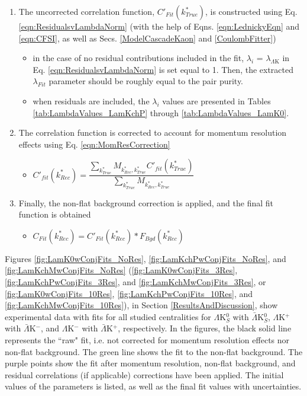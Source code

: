 \documentclass[../AnalysisNoteJBuxton.tex]{subfiles}
\begin{document}
\begin{enumerate}
 \item The uncorrected correlation function, $C'_{Fit}(k^{*}_{True})$, is constructed using Eq. \ref{eqn:ResidualsvLambdaNorm} (with the help of Eqns. \ref{eqn:LednickyEqn} and \ref{eqn:CFSI}, as well as Secs. \ref{ModelCascadeKaon} and \ref{CoulombFitter})
 \begin{itemize}
 \item in the case of no residual contributions included in the fit, $\lambda_{i}$ = $\lambda_{\Lambda\mathrm{K}}$ in Eq. \ref{eqn:ResidualsvLambdaNorm} is set equal to 1.  Then, the extracted $\lambda_{Fit}$ parameter should be roughly equal to the pair purity.
 \item when residuals are included, the $\lambda_{i}$ values are presented in Tables \ref{tab:LambdaValues_LamKchP} through \ref{tab:LambdaValues_LamK0}.
 \end{itemize}
 \item The correlation function is corrected to account for momentum resolution effects using Eq. \ref{eqn:MomResCorrection}
 \begin{itemize}
  \item $C'_{fit}(k^{*}_{Rec}) = \dfrac{\sum\limits_{k^{*}_{True}}M_{k^{*}_{Rec},k^{*}_{True}}C'_{fit}(k^{*}_{True})}{\sum\limits_{k^{*}_{True}}M_{k^{*}_{Rec},k^{*}_{True}}}$
 \end{itemize}
 \item Finally, the non-flat background correction is applied, and the final fit function is obtained
 \begin{itemize}
  \item $C_{Fit}(k^{*}_{Rec}) = C'_{Fit}(k^{*}_{Rec})*F_{Bgd}(k^{*}_{Rec})$
 \end{itemize}
\end{enumerate}

Figures \ref{fig:LamK0wConjFits_NoRes}, \ref{fig:LamKchPwConjFits_NoRes}, and \ref{fig:LamKchMwConjFits_NoRes} (\ref{fig:LamK0wConjFits_3Res}, \ref{fig:LamKchPwConjFits_3Res}, and \ref{fig:LamKchMwConjFits_3Res}, or \ref{fig:LamK0wConjFits_10Res}, \ref{fig:LamKchPwConjFits_10Res}, and \ref{fig:LamKchMwConjFits_10Res}), in Section \ref{ResultsAndDiscussion}, show experimental data with fits for all studied centralities for $\Lambda$K$^{0}_{S}$ with $\bar{\Lambda}$K$^{0}_{S}$, $\Lambda$K$^{+}$ with $\bar{\Lambda}$K$^{-}$, and $\Lambda$K$^{-}$ with $\bar{\Lambda}$K$^{+}$, respectively.  In the figures, the black solid line represents the ``raw" fit, i.e. not corrected for momentum resolution effects nor non-flat background.  The green line shows the fit to the non-flat background.  The purple points show the fit after momentum resolution, non-flat background, and residual correlations (if applicable) corrections have been applied.  The initial values of the parameters is listed, as well as the final fit values with uncertainties.
\end{document}
